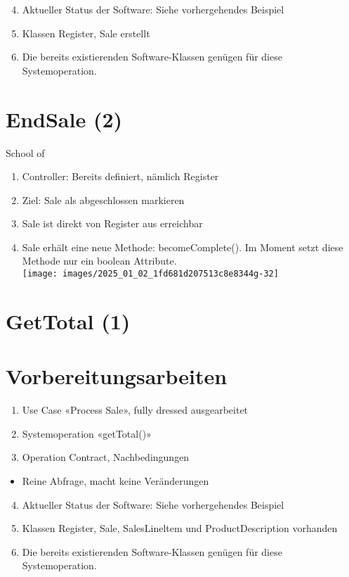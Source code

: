 \documentclass[10pt]{article}
\begin{document}
\begin{enumerate}
  \setcounter{enumi}{3}
  \item Aktueller Status der Software: Siehe vorhergehendes Beispiel
  \item Klassen Register, Sale erstellt
  \item Die bereits existierenden Software-Klassen genügen für diese Systemoperation.
\end{enumerate}

\section*{EndSale (2)}
School of

\begin{enumerate}
  \item Controller: Bereits definiert, nämlich Register
  \item Ziel: Sale als abgeschlossen markieren
  \item Sale ist direkt von Register aus erreichbar
  \item Sale erhält eine neue Methode: becomeComplete(). Im Moment setzt diese Methode nur ein boolean Attribute.\\
\texttt{[image: images/2025\_01\_02\_1fd681d207513c8e8344g-32]}
\end{enumerate}

\section*{GetTotal (1)}
\section*{Vorbereitungsarbeiten}
\begin{enumerate}
  \item Use Case «Process Sale», fully dressed ausgearbeitet
  \item Systemoperation «getTotal()»
  \item Operation Contract, Nachbedingungen
\end{enumerate}

\begin{itemize}
  \item Reine Abfrage, macht keine Veränderungen
\end{itemize}

\begin{enumerate}
  \setcounter{enumi}{3}
  \item Aktueller Status der Software: Siehe vorhergehendes Beispiel
  \item Klassen Register, Sale, SalesLineltem und ProductDescription vorhanden
  \item Die bereits existierenden Software-Klassen genügen für diese Systemoperation.
\end{enumerate}
\end{document}
